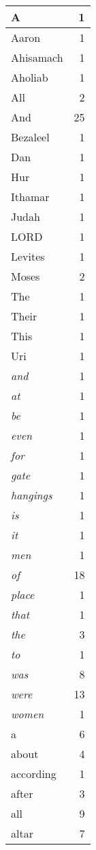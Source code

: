 \begin{center}
\begin{longtable}{l|r}
\hline \hline
\endlastfoot
A & 1 \\ \hline
Aaron & 1 \\ \hline
Ahisamach & 1 \\ \hline
Aholiab & 1 \\ \hline
All & 2 \\ \hline
And & 25 \\ \hline
Bezaleel & 1 \\ \hline
Dan & 1 \\ \hline
Hur & 1 \\ \hline
Ithamar & 1 \\ \hline
Judah & 1 \\ \hline
LORD & 1 \\ \hline
Levites & 1 \\ \hline
Moses & 2 \\ \hline
The & 1 \\ \hline
Their & 1 \\ \hline
This & 1 \\ \hline
Uri & 1 \\ \hline
\emph{and} & 1 \\ \hline
\emph{at} & 1 \\ \hline
\emph{be} & 1 \\ \hline
\emph{even} & 1 \\ \hline
\emph{for} & 1 \\ \hline
\emph{gate} & 1 \\ \hline
\emph{hangings} & 1 \\ \hline
\emph{is} & 1 \\ \hline
\emph{it} & 1 \\ \hline
\emph{men} & 1 \\ \hline
\emph{of} & 18 \\ \hline
\emph{place} & 1 \\ \hline
\emph{that} & 1 \\ \hline
\emph{the} & 3 \\ \hline
\emph{to} & 1 \\ \hline
\emph{was} & 8 \\ \hline
\emph{were} & 13 \\ \hline
\emph{women} & 1 \\ \hline
a & 6 \\ \hline
about & 4 \\ \hline
according & 1 \\ \hline
after & 3 \\ \hline
all & 9 \\ \hline
altar & 7 \\ \hline

\end{longtable}
\end{center}
